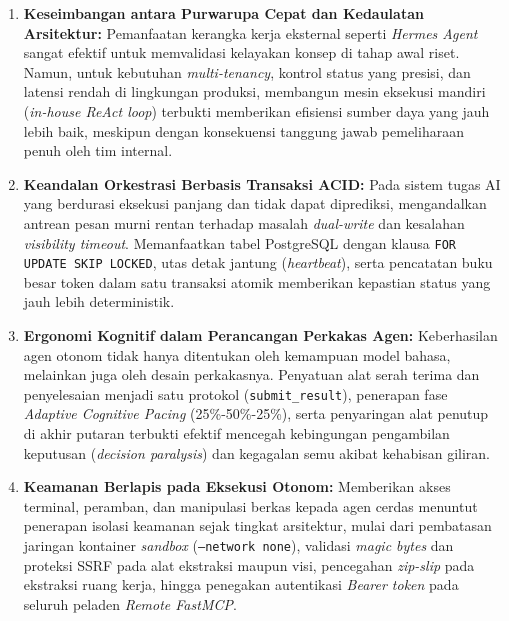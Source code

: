 \begin{enumerate}[label=\arabic*., leftmargin=*, itemsep=0pt]
  \item \textbf{Keseimbangan antara Purwarupa Cepat dan Kedaulatan Arsitektur:} Pemanfaatan kerangka kerja eksternal seperti \textit{Hermes Agent} sangat efektif untuk memvalidasi kelayakan konsep di tahap awal riset. Namun, untuk kebutuhan \textit{multi-tenancy}, kontrol status yang presisi, dan latensi rendah di lingkungan produksi, membangun mesin eksekusi mandiri (\textit{in-house ReAct loop}) terbukti memberikan efisiensi sumber daya yang jauh lebih baik, meskipun dengan konsekuensi tanggung jawab pemeliharaan penuh oleh tim internal.
  \item \textbf{Keandalan Orkestrasi Berbasis Transaksi ACID:} Pada sistem tugas AI yang berdurasi eksekusi panjang dan tidak dapat diprediksi, mengandalkan antrean pesan murni rentan terhadap masalah \textit{dual-write} dan kesalahan \textit{visibility timeout}. Memanfaatkan tabel PostgreSQL dengan klausa \texttt{FOR UPDATE SKIP LOCKED}, utas detak jantung (\textit{heartbeat}), serta pencatatan buku besar token dalam satu transaksi atomik memberikan kepastian status yang jauh lebih deterministik.
  \item \textbf{Ergonomi Kognitif dalam Perancangan Perkakas Agen:} Keberhasilan agen otonom tidak hanya ditentukan oleh kemampuan model bahasa, melainkan juga oleh desain perkakasnya. Penyatuan alat serah terima dan penyelesaian menjadi satu protokol (\texttt{submit\_result}), penerapan fase \textit{Adaptive Cognitive Pacing} (25\%-50\%-25\%), serta penyaringan alat penutup di akhir putaran terbukti efektif mencegah kebingungan pengambilan keputusan (\textit{decision paralysis}) dan kegagalan semu akibat kehabisan giliran.
  \item \textbf{Keamanan Berlapis pada Eksekusi Otonom:} Memberikan akses terminal, peramban, dan manipulasi berkas kepada agen cerdas menuntut penerapan isolasi keamanan sejak tingkat arsitektur, mulai dari pembatasan jaringan kontainer \textit{sandbox} (\texttt{--network none}), validasi \textit{magic bytes} dan proteksi SSRF pada alat ekstraksi maupun visi, pencegahan \textit{zip-slip} pada ekstraksi ruang kerja, hingga penegakan autentikasi \textit{Bearer token} pada seluruh peladen \textit{Remote FastMCP}.
\end{enumerate}
